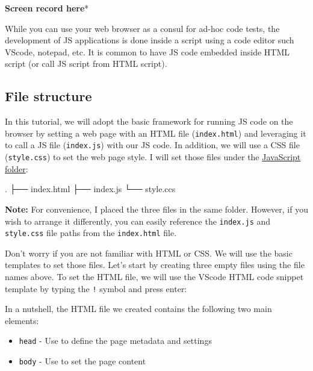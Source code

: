 \documentclass[
  letterpaper,
  DIV=11,
  numbers=noendperiod]{scrreprt}
\newenvironment{Shaded}{\begin{snugshade}}{\end{snugshade}}
\newcommand{\NormalTok}[1]{\textcolor[rgb]{0.00,0.23,0.31}{#1}}
\providecommand{\tightlist}{%
  \setlength{\itemsep}{0pt}\setlength{\parskip}{0pt}}\usepackage{longtable,booktabs,array}
\begin{document}
\textbf{Screen record here}*

While you can use your web browser as a consul for ad-hoc code tests,
the development of JS applications is done inside a script using a code
editor such VScode, notepad, etc. It is common to have JS code embedded
inside HTML script (or call JS script from HTML script).

\hypertarget{file-structure}{%
\subsection{File structure}\label{file-structure}}

In this tutorial, we will adopt the basic framework for running JS code
on the browser by setting a web page with an HTML file
(\texttt{index.html}) and leveraging it to call a JS file
(\texttt{index.js}) with our JS code. In addition, we will use a CSS
file (\texttt{style.css}) to set the web page style. I will set those
files under the
\href{https://github.com/RamiKrispin/Tutorials/tree/main/JavaScript}{JavaScript
folder}:

\begin{Shaded}
\begin{Highlighting}[]
\NormalTok{.}
\NormalTok{├── index.html}
\NormalTok{├── index.js}
\NormalTok{└── style.ccs}
\end{Highlighting}
\end{Shaded}

\textbf{Note:} For convenience, I placed the three files in the same
folder. However, if you wish to arrange it differently, you can easily
reference the \texttt{index.js} and \texttt{style.css} file paths from
the \texttt{index.html} file.

Don't worry if you are not familiar with HTML or CSS. We will use the
basic templates to set those files. Let's start by creating three empty
files using the file names above. To set the HTML file, we will use the
VScode HTML code snippet template by typing the \texttt{!} symbol and
press enter:

In a nutshell, the HTML file we created contains the following two main
elements:

\begin{itemize}
\tightlist
\item
  \texttt{head} - Use to define the page metadata and settings
\item
  \texttt{body} - Use to set the page content
\end{itemize}
\end{document}
